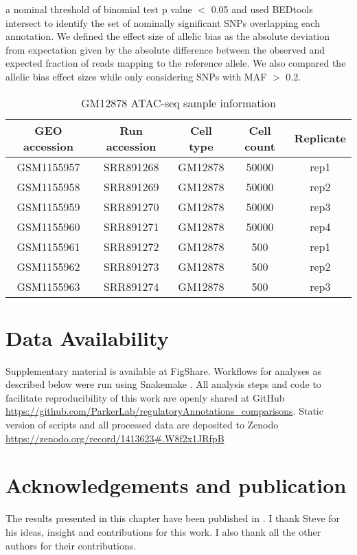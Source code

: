 a nominal threshold of binomial test p value $<$ 0.05 and used BEDtools intersect to identify the set of nominally significant SNPs overlapping each annotation. We defined the effect size of allelic bias as the absolute deviation from expectation given by the absolute difference between the observed and expected fraction of reads mapping to the reference allele. We also compared the allelic bias effect sizes while only considering SNPs with MAF $>$ 0.2.

\begin{table}
  \caption[GM12878 ATAC-seq sample information]{GM12878 ATAC-seq sample information}
  \label{tbl:c1_t2}
\begin{center}
 \begin{tabular}{||c c c c c||} 
   \hline
   GEO accession & Run accession & Cell type & Cell count & Replicate \\ [0.5ex] 
 \hline\hline
   GSM1155957 & SRR891268 & GM12878 & 50000 & rep1\\
   GSM1155958 & SRR891269 & GM12878 & 50000 & rep2\\
   GSM1155959 &  SRR891270 & GM12878 & 50000 & rep3\\
   GSM1155960 & SRR891271 & GM12878 & 50000 & rep4\\
   GSM1155961 & SRR891272 & GM12878 & 500 & rep1\\
   GSM1155962 & SRR891273 & GM12878 & 500 & rep2\\
   GSM1155963 &  SRR891274 & GM12878 & 500 & rep3\\
 \hline
\end{tabular}
\end{center}
\end{table}  



\section{Data Availability}
Supplementary material is available at FigShare. Workflows for analyses as described below were run using Snakemake \cite{kosterSnakemakeScalableBioinformatics2012}. All analysis steps and code to facilitate reproducibility of this work are openly shared at GitHub \url{https://github.com/ParkerLab/regulatoryAnnotations_comparisons}. Static version of scripts and all processed data are deposited to Zenodo \url{https://zenodo.org/record/1413623#.W8f2x1JRfpB}


\section{Acknowledgements and publication}
The results presented in this chapter have been published in \cite{varshneyCellSpecificityHuman2018}. I thank Steve for his ideas, insight and contributions for this work. I also thank all the other authors for their contributions.





